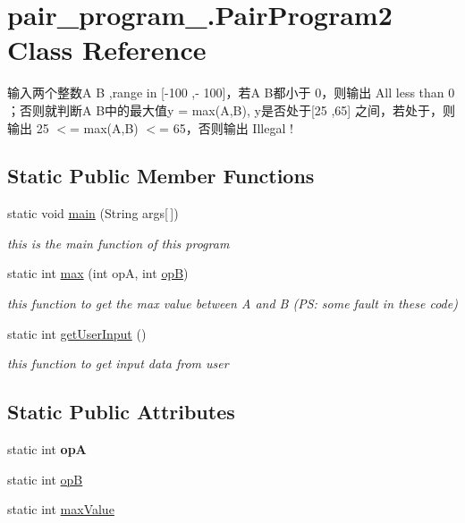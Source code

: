 \hypertarget{classpair__program__2_1_1_pair_program2}{}\section{pair\+\_\+program\+\_.\+Pair\+Program2 Class Reference}
\label{classpair__program__2_1_1_pair_program2}


输入两个整数A B ,range in \mbox{[}-\/100 ,-\/ 100\mbox{]}，若A B都小于 0，则输出 All less than 0 ；否则就判断A B中的最大值y = max(\+A,\+B), y是否处于\mbox{[}25 ,65\mbox{]} 之间，若处于，则输出 25 $<$= max(\+A,\+B) $<$= 65，否则输出 Illegal !  


\subsection*{Static Public Member Functions}
\begin{DoxyCompactItemize}
\item 
static void \hyperlink{classpair__program__2_1_1_pair_program2_a97730f700040ee0c06e122b2a3bdb798}{main} (String args\mbox{[}$\,$\mbox{]})
\begin{DoxyCompactList}\small\item\em this is the main function of this program \end{DoxyCompactList}\item 
static int \hyperlink{classpair__program__2_1_1_pair_program2_a300545cfc9b2715cf8c8156f042e3475}{max} (int opA, int \hyperlink{classpair__program__2_1_1_pair_program2_a213dcf08e0608ddf9677e6fff25e121b}{opB})
\begin{DoxyCompactList}\small\item\em this function to get the max value between A and B (PS\+: some fault in these code) \end{DoxyCompactList}\item 
static int \hyperlink{classpair__program__2_1_1_pair_program2_a8ecdaedc2308f219d9f3a476b0d147a9}{get\+User\+Input} ()
\begin{DoxyCompactList}\small\item\em this function to get input data from user \end{DoxyCompactList}\end{DoxyCompactItemize}
\subsection*{Static Public Attributes}
\begin{DoxyCompactItemize}
\item 
static int {\bfseries opA}\hypertarget{classpair__program__2_1_1_pair_program2_abb048aef52cf812bf9bd7714f1905e3f}{}\label{classpair__program__2_1_1_pair_program2_abb048aef52cf812bf9bd7714f1905e3f}

\item 
static int \hyperlink{classpair__program__2_1_1_pair_program2_a213dcf08e0608ddf9677e6fff25e121b}{opB}
\item 
static int \hyperlink{classpair__program__2_1_1_pair_program2_af712c4cc9f263ab80e4ad244c7e095f1}{max\+Value}
\end{DoxyCompactItemize}


